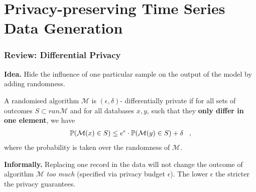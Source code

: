 \section{Privacy-preserving Time Series Data Generation}

\begin{frame}
    \frametitle{Review: Differential Privacy}
    \textbf{Idea.} \alert{Hide the influence} of one particular sample on the output of the model by \alert{adding randomness}.
    \begin{definition}
        A randomised algorithm $\mathcal{M}$ is $(\epsilon, \delta)$- differentially private if for all sets of outcomes $S \subset ran \mathcal{M}$ and for all databases $x,y $, such that they \textbf{only differ in one element}, we have
        \begin{align}
            \mathbb{P}(\mathcal{M}(x) \in S) \le e^\epsilon \cdot \mathbb{P}(\mathcal{M}(y) \in S) + \delta \;\;\;,
        \end{align}
        where the probability is taken over the randomness of $\mathcal{M}$.
    \end{definition}

    \textbf{Informally.} Replacing one record in the data will not change the outcome of algorithm $\mathcal{M}$ \textit{too much} (specified via privacy budget $\epsilon$). The lower $\epsilon$ the stricter the privacy guarantees.

\end{frame}

